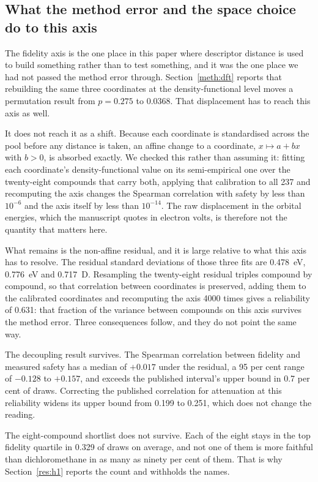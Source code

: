 \documentclass[11pt,a4paper]{article}
\begin{document}
\subsection{What the method error and the space choice do to this axis}
\label{meth:h1stab}

The fidelity axis is the one place in this paper where descriptor distance is
used to build something rather than to test something, and it was the one place
we had not passed the method error through. Section~\ref{meth:dft} reports that
rebuilding the same three coordinates at the density-functional level moves a
permutation result from $p=0.275$ to 0.0368. That displacement has to reach this
axis as well.

It does not reach it as a shift. Because each coordinate is standardised across
the pool before any distance is taken, an affine change to a coordinate,
$x \mapsto a + bx$ with $b>0$, is absorbed exactly. We checked this rather than
assuming it: fitting each coordinate's density-functional value on its
semi-empirical one over the twenty-eight compounds that carry both, applying
that calibration to all 237 and recomputing the axis changes the Spearman
correlation with safety by less than $10^{-6}$ and the axis itself by less than
$10^{-14}$. The raw displacement in the orbital energies, which the manuscript
quotes in electron volts, is therefore not the quantity that matters here.

What remains is the non-affine residual, and it is large relative to what this
axis has to resolve. The residual standard deviations of those three fits are
0.478~eV, 0.776~eV and 0.717~D. Resampling the twenty-eight residual triples
compound by compound, so that correlation between coordinates is preserved,
adding them to the calibrated coordinates and recomputing the axis 4000 times
gives a reliability of 0.631: that fraction of the variance between compounds on
this axis survives the method error. Three consequences follow, and they do not
point the same way.

The decoupling result survives. The Spearman correlation between fidelity and
measured safety has a median of $+0.017$ under the residual, a 95 per cent range
of $-0.128$ to $+0.157$, and exceeds the published interval's upper bound in
0.7 per cent of draws. Correcting the published correlation for attenuation at
this reliability widens its upper bound from 0.199 to 0.251, which does not
change the reading.

The eight-compound shortlist does not survive. Each of the eight stays in the
top fidelity quartile in 0.329 of draws on average, and not one of them is more
faithful than dichloromethane in as many as ninety per cent of them. That is why
Section~\ref{res:h1} reports the count and withholds the names.
\end{document}
